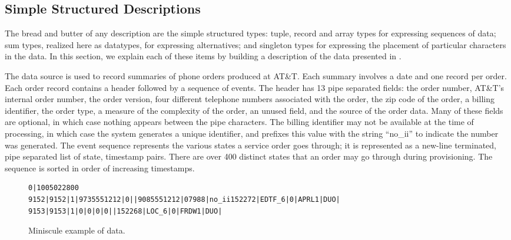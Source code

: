 \subsection{Simple Structured Descriptions}

The bread and butter of any \padsml{} description are the simple
structured types: tuple, record and array types for expressing
sequences of data; sum types, realized here as datatypes, for
expressing alternatives; and singleton types for expressing the
placement of particular characters in the data.  In this section, we
explain each of these items by building a description of the
\dibbler{} data presented in .

The \dibbler{} data source is used to record summaries of phone orders
produced at AT\&T.  Each summary involves a date and one record per
order.  Each order record contains a header followed by a sequence of
events.  The header has 13 pipe separated fields: the order number,
AT\&T's internal order number, the order version, four different
telephone numbers associated with the order, the zip code of the
order, a billing identifier, the order type, a measure of the
complexity of the order, an unused field, and the source of the order
data.  Many of these fields are optional, in which case nothing
appears between the pipe characters.  The billing identifier may not
be available at the time of processing, in which case the system
generates a unique identifier, and prefixes this value with the string
``no\_ii'' to indicate the number was generated. The event sequence
represents the various states a service order goes through; it is
represented as a new-line terminated, pipe separated list of state,
timestamp pairs.  There are over 400 distinct states that an order may
go through during provisioning.  The sequence is sorted in order of
increasing timestamps.


\begin{figure*}
  \begin{small}
\begin{verbatim}
0|1005022800
9152|9152|1|9735551212|0||9085551212|07988|no_ii152272|EDTF_6|0|APRL1|DUO|
9153|9153|1|0|0|0|0||152268|LOC_6|0|FRDW1|DUO|
\end{verbatim}
    \caption{Miniscule example of \dibbler{} data.}
    \label{figure:dibbler-records}
  \end{small}
\end{figure*}

